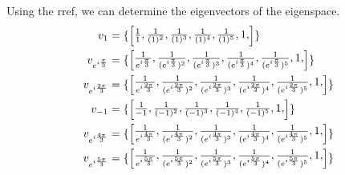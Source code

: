 Using the rref, we can determine the eigenvectors of the eigenspace.
\begin{align}
    v_1 &= \{\eigenvector{1}\}\\
    v_{\eulerID{\pi}{3}} &= \{\eigenvector{\eulerID{\pi}{3}}\}\\
    v_{\eulerID{2\pi}{3}} &= \{\eigenvector{\eulerID{2\pi}{3}}\}\\
    v_{-1} &= \{\eigenvector{-1}\}\\
    v_{\eulerID{4\pi}{3}} &= \{\eigenvector{\eulerID{4\pi}{3}}\}\\
    v_{\eulerID{5\pi}{3}} &=\{\eigenvector{\eulerID{5\pi}{3}}\}
\end{align}
